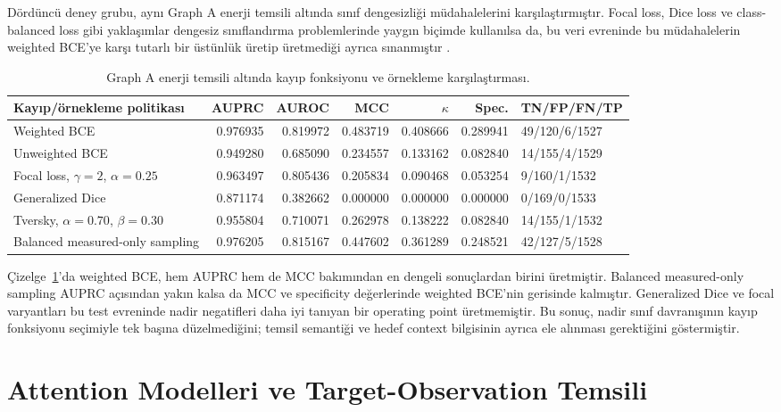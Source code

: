Dördüncü deney grubu, aynı Graph A enerji temsili altında sınıf dengesizliği müdahalelerini karşılaştırmıştır. Focal loss, Dice loss ve class-balanced loss gibi yaklaşımlar dengesiz sınıflandırma problemlerinde yaygın biçimde kullanılsa da, bu veri evreninde bu müdahalelerin weighted BCE'ye karşı tutarlı bir üstünlük üretip üretmediği ayrıca sınanmıştır .

\begin{table}[htbp]
\caption{Graph A enerji temsili altında kayıp fonksiyonu ve örnekleme karşılaştırması.}
\label{tab:loss-sampling}
\centering
\scriptsize
\begin{tabularx}{\textwidth}{>{\raggedright\arraybackslash}X r r r r r l}
\toprule\toprule
Kayıp/örnekleme politikası & AUPRC & AUROC & MCC & $\kappa$ & Spec. & TN/FP/FN/TP\\
\midrule
Weighted BCE & 0.976935 & 0.819972 & 0.483719 & 0.408666 & 0.289941 & 49/120/6/1527\\
Unweighted BCE & 0.949280 & 0.685090 & 0.234557 & 0.133162 & 0.082840 & 14/155/4/1529\\
Focal loss, $\gamma=2$, $\alpha=0.25$ & 0.963497 & 0.805436 & 0.205834 & 0.090468 & 0.053254 & 9/160/1/1532\\
Generalized Dice & 0.871174 & 0.382662 & 0.000000 & 0.000000 & 0.000000 & 0/169/0/1533\\
Tversky, $\alpha=0.70$, $\beta=0.30$ & 0.955804 & 0.710071 & 0.262978 & 0.138222 & 0.082840 & 14/155/1/1532\\
Balanced measured-only sampling & 0.976205 & 0.815167 & 0.447602 & 0.361289 & 0.248521 & 42/127/5/1528\\
\bottomrule
\end{tabularx}
\end{table}

Çizelge~\ref{tab:loss-sampling}'da weighted BCE, hem AUPRC hem de MCC bakımından en dengeli sonuçlardan birini üretmiştir. Balanced measured-only sampling AUPRC açısından yakın kalsa da MCC ve specificity değerlerinde weighted BCE'nin gerisinde kalmıştır. Generalized Dice ve focal varyantları bu test evreninde nadir negatifleri daha iyi tanıyan bir operating point üretmemiştir. Bu sonuç, nadir sınıf davranışının kayıp fonksiyonu seçimiyle tek başına düzelmediğini; temsil semantiği ve hedef context bilgisinin ayrıca ele alınması gerektiğini göstermiştir.

\section{Attention Modelleri ve Target-Observation Temsili}

